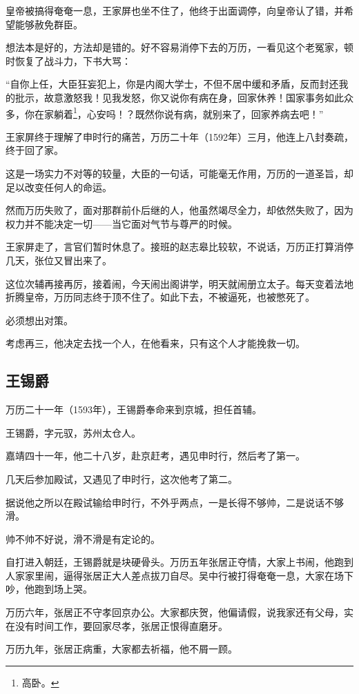 \begin{multicols}{\theparacolNo}
皇帝被搞得奄奄一息，王家屏也坐不住了，他终于出面调停，向皇帝认了错，并希望能够赦免群臣。

想法本是好的，方法却是错的。好不容易消停下去的万历，一看见这个老冤家，顿时恢复了战斗力，下书大骂：

“自你上任，大臣狂妄犯上，你是内阁大学士，不但不居中缓和矛盾，反而封还我的批示，故意激怒我！见我发怒，你又说你有病在身，回家休养！国家事务如此众多，你在家躺着\footnote{高卧。}，心安吗！？既然你说有病，就别来了，回家养病去吧！”

王家屏终于理解了申时行的痛苦，万历二十年（1592年）三月，他连上八封奏疏，终于回了家。

这是一场实力不对等的较量，大臣的一句话，可能毫无作用，万历的一道圣旨，却足以改变任何人的命运。

然而万历失败了，面对那群前仆后继的人，他虽然竭尽全力，却依然失败了，因为权力并不能决定一切——当它面对气节与尊严的时候。

王家屏走了，言官们暂时休息了。接班的赵志皋比较软，不说话，万历正打算消停几天，张位又冒出来了。

这位次辅再接再厉，接着闹，今天闹出阁讲学，明天就闹册立太子。每天变着法地折腾皇帝，万历同志终于顶不住了。如此下去，不被逼死，也被憋死了。

必须想出对策。

考虑再三，他决定去找一个人，在他看来，只有这个人才能挽救一切。

\subsection{王锡爵}
万历二十一年（1593年），王锡爵奉命来到京城，担任首辅。

王锡爵，字元驭，苏州太仓人。

嘉靖四十一年，他二十八岁，赴京赶考，遇见申时行，然后考了第一。

几天后参加殿试，又遇见了申时行，这次他考了第二。

据说他之所以在殿试输给申时行，不外乎两点，一是长得不够帅，二是说话不够滑。

帅不帅不好说，滑不滑是有定论的。

自打进入朝廷，王锡爵就是块硬骨头。万历五年张居正夺情，大家上书闹，他跑到人家家里闹，逼得张居正大人差点拔刀自尽。吴中行被打得奄奄一息，大家在场下吵，他跑到场上哭。

万历六年，张居正不守孝回京办公。大家都庆贺，他偏请假，说我家还有父母，实在没有时间工作，要回家尽孝，张居正恨得直磨牙。

万历九年，张居正病重，大家都去祈福，他不屑一顾。


\end{multicols}

